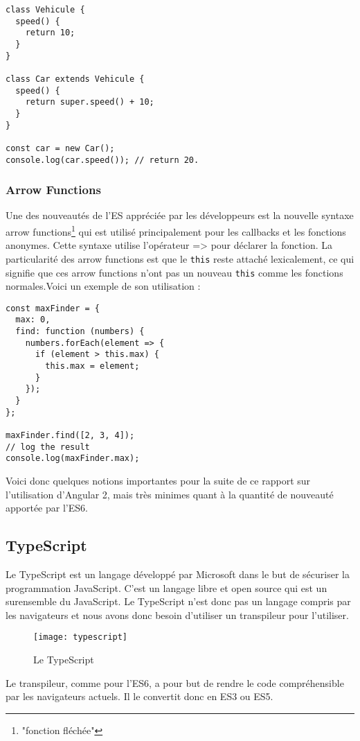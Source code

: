 \begin{lstlisting}[style=htmlcssjs, caption={Une classe avec héritage en ES6}]
class Vehicule {
  speed() {
    return 10;
  }
}

class Car extends Vehicule {
  speed() {
    return super.speed() + 10;
  }
}

const car = new Car();
console.log(car.speed()); // return 20.
\end{lstlisting}

\subsubsection{Arrow Functions}
Une des nouveautés de l'ES appréciée par les développeurs est la nouvelle syntaxe arrow functions\footnote{"fonction fléchée"} qui est utilisé principalement pour les callbacks et les fonctions anonymes. Cette syntaxe utilise l'opérateur => pour déclarer la fonction. La particularité des arrow functions est que le \texttt{this} reste attaché lexicalement, ce qui signifie que ces arrow functions n’ont pas un nouveau \texttt{this} comme les fonctions normales.Voici un exemple de son utilisation :
\begin{lstlisting}[style=htmlcssjs, caption={Exemple d'Arrow Function}]
const maxFinder = {
  max: 0,
  find: function (numbers) {
    numbers.forEach(element => {
      if (element > this.max) {
        this.max = element;
      }
    });
  }
};

maxFinder.find([2, 3, 4]);
// log the result
console.log(maxFinder.max);
\end{lstlisting}


Voici donc quelques notions importantes pour la suite de ce rapport sur l'utilisation d'Angular 2, mais très minimes quant à la quantité de nouveauté apportée par l'ES6. 

\subsection{TypeScript}

Le TypeScript est un langage développé par Microsoft dans le but de sécuriser la programmation JavaScript\cite{wiki:TypeScript}. C'est un langage libre et open source qui est un surensemble du JavaScript. Le TypeScript n'est donc pas un langage compris par les navigateurs et nous avons donc besoin d'utiliser un transpileur pour l'utiliser.
\begin{figure}[h]
	\centering
	\texttt{[image: typescript]}
	\caption{Le TypeScript}
\end{figure}
Le transpileur, comme pour l'ES6, a pour but de rendre le code compréhensible par les navigateurs actuels. Il le convertit donc en ES3 ou ES5.

